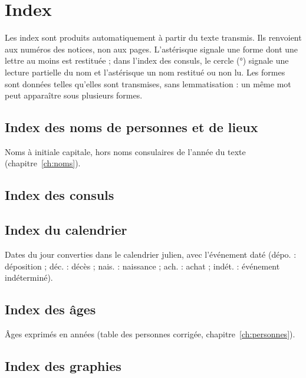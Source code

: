 \chapter{Index}\label{ch:index}

Les index sont produits automatiquement à partir du texte transmis. Ils renvoient aux numéros des notices, non aux pages. L’astérisque signale une forme dont une lettre au moins est restituée ; dans l’index des consuls, le cercle (°) signale une lecture partielle du nom et l’astérisque un nom restitué ou non lu. Les formes sont données telles qu’elles sont transmises, sans lemmatisation : un même mot peut apparaître sous plusieurs formes.

\section{Index des noms de personnes et de lieux}

Noms à initiale capitale, hors noms consulaires de l’année du texte (chapitre~\ref{ch:noms}).



\section{Index des consuls}



\section{Index du calendrier}

Dates du jour converties dans le calendrier julien, avec l’événement daté (dépo. : déposition ; déc. : décès ; nais. : naissance ; ach. : achat ; indét. : événement indéterminé).



\section{Index des âges}

Âges exprimés en années (table des personnes corrigée, chapitre~\ref{ch:personnes}).



\section{Index des graphies}

